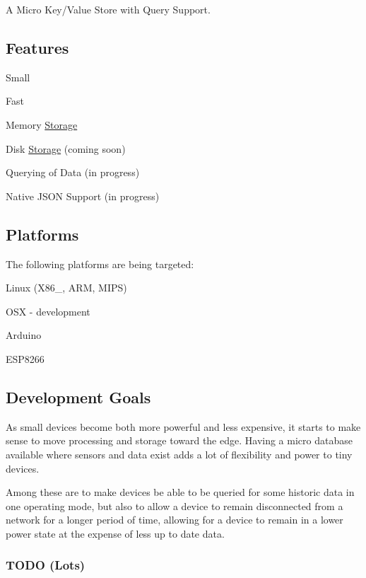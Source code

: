 A Micro Key/\+Value Store with Query Support.

\subsection*{Features}


\begin{DoxyItemize}
\item Small
\item Fast
\item Memory \hyperlink{struct_storage}{Storage}
\item Disk \hyperlink{struct_storage}{Storage} (coming soon)
\item Querying of Data (in progress)
\item Native J\+S\+O\+N Support (in progress)
\end{DoxyItemize}

\subsection*{Platforms}

The following platforms are being targeted\+:
\begin{DoxyItemize}
\item Linux (X86\+\_, A\+R\+M, M\+I\+P\+S)
\item O\+S\+X -\/ development
\item Arduino
\item E\+S\+P8266
\end{DoxyItemize}

\subsection*{Development Goals}

As small devices become both more powerful and less expensive, it starts to make sense to move processing and storage toward the edge. Having a micro database available where sensors and data exist adds a lot of flexibility and power to tiny devices.

Among these are to make devices be able to be queried for some historic data in one operating mode, but also to allow a device to remain disconnected from a network for a longer period of time, allowing for a device to remain in a lower power state at the expense of less up to date data.

\subsubsection*{T\+O\+D\+O (Lots)}


